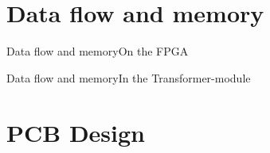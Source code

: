 \documentclass[10pt]{beamer}
\begin{document}
\section{Data flow and memory}


\begin{frame}{Data flow and memory}{On the FPGA}
\end{frame}

\begin{frame}{Data flow and memory}{In the Transformer-module}
\end{frame}


\section{PCB Design}
\end{document}
